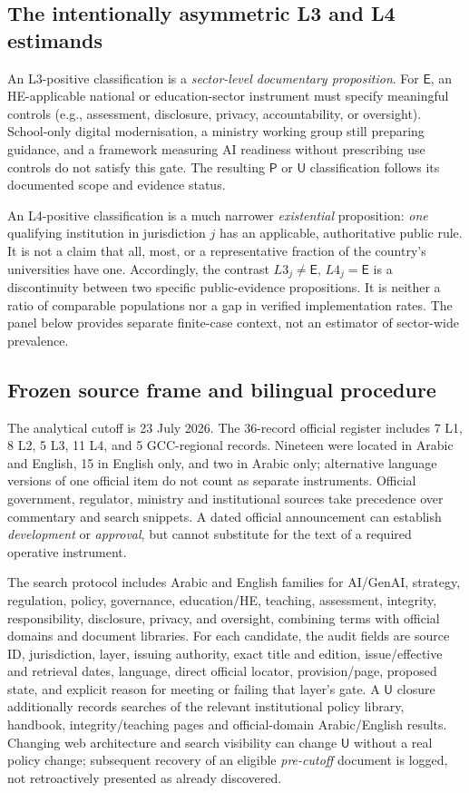 \documentclass[conference,letterpaper]{IEEEtran}
\newcommand{\stE}{\textsf{E}}
\newcommand{\stP}{\textsf{P}}
\newcommand{\stU}{\textsf{U}}
\begin{document}
\subsection{The intentionally asymmetric L3 and L4 estimands}
An L3-positive classification is a \emph{sector-level documentary proposition}. For $\stE$, an HE-applicable national or education-sector instrument must specify meaningful controls (e.g., assessment, disclosure, privacy, accountability, or oversight). School-only digital modernisation, a ministry working group still preparing guidance, and a framework measuring AI readiness without prescribing use controls do not satisfy this gate. The resulting $\stP$ or $\stU$ classification follows its documented scope and evidence status.

An L4-positive classification is a much narrower \emph{existential} proposition: \emph{one} qualifying institution in jurisdiction $j$ has an applicable, authoritative public rule. It is not a claim that all, most, or a representative fraction of the country's universities have one. Accordingly, the contrast $L3_j\ne\stE$, $L4_j=\stE$ is a discontinuity between two specific public-evidence propositions. It is neither a ratio of comparable populations nor a gap in verified implementation rates. The panel below provides separate finite-case context, not an estimator of sector-wide prevalence.

\subsection{Frozen source frame and bilingual procedure}
The analytical cutoff is 23 July 2026. The 36-record official register includes 7 L1, 8 L2, 5 L3, 11 L4, and 5 GCC-regional records. Nineteen were located in Arabic and English, 15 in English only, and two in Arabic only; alternative language versions of one official item do not count as separate instruments. Official government, regulator, ministry and institutional sources take precedence over commentary and search snippets. A dated official announcement can establish \emph{development} or \emph{approval}, but cannot substitute for the text of a required operative instrument.

The search protocol includes Arabic and English families for AI/GenAI, strategy, regulation, policy, governance, education/HE, teaching, assessment, integrity, responsibility, disclosure, privacy, and oversight, combining terms with official domains and document libraries. For each candidate, the audit fields are source ID, jurisdiction, layer, issuing authority, exact title and edition, issue/effective and retrieval dates, language, direct official locator, provision/page, proposed state, and explicit reason for meeting or failing that layer's gate. A $\stU$ closure additionally records searches of the relevant institutional policy library, handbook, integrity/teaching pages and official-domain Arabic/English results. Changing web architecture and search visibility can change $\stU$ without a real policy change; subsequent recovery of an eligible \emph{pre-cutoff} document is logged, not retroactively presented as already discovered.
\end{document}
